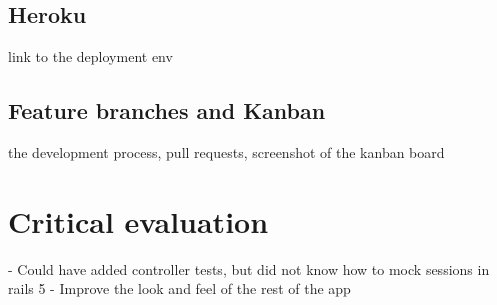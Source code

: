 \documentclass[a4paper, 11pt, titlepage]{article}
\begin{document}
\subsection{Heroku}
link to the deployment env

\subsection{Feature branches and Kanban}
the development process, pull requests, screenshot of the kanban board

\section{Critical evaluation}
- Could have added controller tests, but did not know how to mock sessions in rails 5
- Improve the look and feel of the rest of the app

%
%
\end{document}
